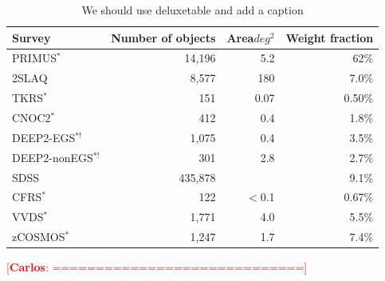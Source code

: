 \documentclass[preprint]{aastex}
\newcommand{\cc}[1]{\textcolor{red}{[{\bf Carlos}: #1]}}
\begin{document}

\begin{table}[!ht]
\caption{{\color{red}We should use deluxetable and add a caption}}
\label{tbl:weistats}
\begin{center}
\begin{tabular}{ l r r r }\hline \hline
Survey & Number of objects & Area$deg^2$ & Weight fraction \\ \hline 
PRIMUS$^*$ &14,196 &5.2 & 62\% \\
2SLAQ  &8,577 & 180 & 7.0\%\\
TKRS$^*$  &151  & 0.07& 0.50\%\\
CNOC2$^*$ &412  &0.4 & 1.8\%\\
DEEP2-EGS$^{*!}$ &1,075  & 0.4 & 3.5\%\\
DEEP2-nonEGS$^{*!}$ &301  & 2.8 & 2.7\%\\
SDSS &435,878  & & 9.1\%\\
CFRS$^*$ &122  & $<$0.1 & 0.67\%\\
VVDS$^*$ &1,771  &4.0  & 5.5\%\\
zCOSMOS$^*$ &1,247 &1.7  & 7.4\% \\ \hline \hline
\end{tabular}
\end{center} 
\end{table}


\cc{=============================} 
\end{document}

